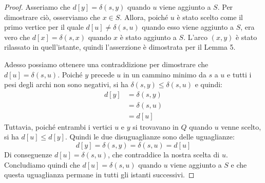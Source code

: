 \begin{proof}
Asseriamo che $d[y] = \delta(s,y)$ quando $u$ viene aggiunto a $S$. Per dimostrare ciò, osserviamo che $x \in S$. Allora, poiché $u$ è stato scelto come il primo vertice per il quale $d[u] \neq \delta(s,u)$ quando esso viene aggiunto a $S$, era vero che $d[x]=\delta(s,x)$ quando $x$ è stato aggiunto a $S$. L'arco $(x,y)$ è stato rilassato in quell'istante, quindi l'asserzione è dimostrata per il Lemma 5.

Adesso possiamo ottenere una contraddizione per dimostrare che $d[u]= \delta(s,u)$. Poiché $y$ precede $u$ in un cammino minimo da $s$ a $u$ e tutti i pesi degli archi non sono negativi, si ha $\delta(s,y) \leq \delta(s,u)$ e quindi:
\begin{align*}
	d[y] &= \delta(s,y) \\
	&= \delta(s,u)\\
	&= d[u]
\end{align*}
Tuttavia, poiché entrambi i vertici $u$ e $y$ si trovavano in $Q$ quando $u$ venne scelto, si ha $d[u] \leq d[y]$. Quindi le due disuguaglianze sono delle uguaglianze:
\begin{displaymath}
	d[y] = \delta(s,y) = \delta(s,u) = d[u]
\end{displaymath}
Di conseguenze $d[u]= \delta(s,u)$, che contraddice la nostra scelta di $u$. Concludiamo quindi che $d[u]=\delta(s,u)$ quando $u$ viene aggiunto a $S$ e che questa uguaglianza permane in tutti gli istanti successivi. 
\end{proof}

